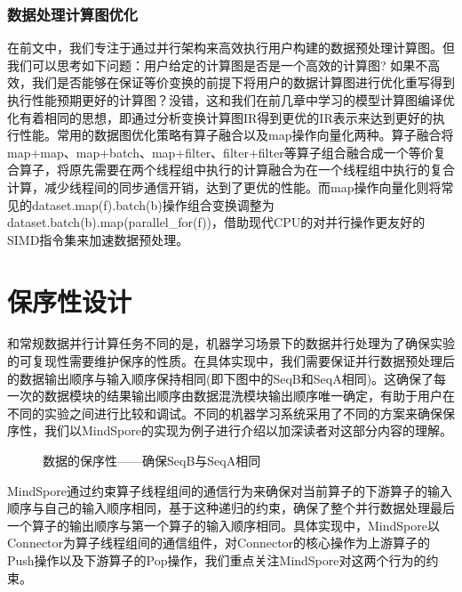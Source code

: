 \documentclass[letterpaper,10pt,english]{sphinxmanual}
\let\sphinxpxdimen\pdfpxdimen\else\newdimen\sphinxpxdimen
\begin{document}
\subsubsection{数据处理计算图优化}
\label{\detokenize{chapter_data_processing/performance:id11}}
\sphinxAtStartPar
在前文中，我们专注于通过并行架构来高效执行用户构建的数据预处理计算图。但我们可以思考如下问题：用户给定的计算图是否是一个高效的计算图?
如果不高效，我们是否能够在保证等价变换的前提下将用户的数据计算图进行优化重写得到执行性能预期更好的计算图？没错，这和我们在前几章中学习的模型计算图编译优化有着相同的思想，即通过分析变换计算图IR得到更优的IR表示来达到更好的执行性能。常用的数据图优化策略有算子融合以及map操作向量化两种。算子融合将map+map、map+batch、map+filter、filter+filter等算子组合融合成一个等价复合算子，将原先需要在两个线程组中执行的计算融合为在一个线程组中执行的复合计算，减少线程间的同步通信开销，达到了更优的性能。而map操作向量化则将常见的dataset.map(f).batch(b)操作组合变换调整为dataset.batch(b).map(parallel\_for(f))，借助现代CPU的对并行操作更友好的SIMD指令集来加速数据预处理。


\section{保序性设计}
\label{\detokenize{chapter_data_processing/data_order:id1}}\label{\detokenize{chapter_data_processing/data_order::doc}}
\sphinxAtStartPar
和常规数据并行计算任务不同的是，机器学习场景下的数据并行处理为了确保实验的可复现性需要维护保序的性质。在具体实现中，我们需要保证并行数据预处理后的数据输出顺序与输入顺序保持相同(即下图中的SeqB和SeqA相同)。这确保了每一次的数据模块的结果输出顺序由数据混洗模块输出顺序唯一确定，有助于用户在不同的实验之间进行比较和调试。不同的机器学习系统采用了不同的方案来确保保序性，我们以MindSpore的实现为例子进行介绍以加深读者对这部分内容的理解。

\begin{figure}[H]
\centering
\capstart

\noindent\sphinxincludegraphics[width=800\sphinxpxdimen]{{data_ordering}.png}
\caption{数据的保序性——确保SeqB与SeqA相同}\label{\detokenize{chapter_data_processing/data_order:id2}}\label{\detokenize{chapter_data_processing/data_order:data-order-definition}}\end{figure}

\sphinxAtStartPar
MindSpore通过约束算子线程组间的通信行为来确保对当前算子的下游算子的输入顺序与自己的输入顺序相同，基于这种递归的约束，确保了整个并行数据处理最后一个算子的输出顺序与第一个算子的输入顺序相同。具体实现中，MindSpore以Connector为算子线程组间的通信组件，对Connector的核心操作为上游算子的Push操作以及下游算子的Pop操作，我们重点关注MindSpore对这两个行为的约束。
\end{document}
